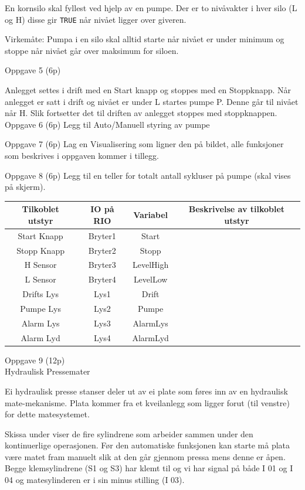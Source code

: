 \vskip 5pt 
En kornsilo skal fyllest ved hjelp av en pumpe. Der er to nivåvakter i hver silo (L og H) disse gir \verb|TRUE| når nivået ligger over giveren.

\vskip 5pt 
Virkemåte: Pumpa i en silo skal alltid starte når nivået er under
minimum og stoppe når nivået går over maksimum for siloen.

\vskip 1cm
Oppgave 5 (6p) %
\vskip 2.5pt 

Anlegget settes i drift med en Start knapp og stoppes med en Stoppknapp.
Når anlegget er satt i drift og nivået er under L startes pumpe P.
Denne går til nivået når H. Slik fortsetter det til driften av anlegget
stoppes med stoppknappen.
\vskip 5pt 
Oppgave 6 (6p) %
\vskip 2.5pt 
Legg til Auto/Manuell styring av pumpe

\vskip 10pt 
Oppgave 7 (6p) %
\vskip 2.5pt 
Lag en Visualisering som ligner den på bildet, alle funksjoner som beskrives i oppgaven kommer i tillegg. 

\vskip 10pt 
Oppgave 8 (6p) %
\vskip 2.5pt 
Legg til en teller for totalt antall sykluser på pumpe (skal vises på skjerm). 
\vskip 1cm

\vskip 5pt 
\vskip 0.5cm
\begin{tabular}{|c|c|c|c|}
\hline 
Tilkoblet utstyr & IO på RIO & Variabel & Beskrivelse av tilkoblet utstyr\tabularnewline
\hline 
\hline 
Start Knapp & Bryter1 & Start & \tabularnewline
\hline 
Stopp Knapp & Bryter2 & Stopp & \tabularnewline
\hline 
H Sensor & Bryter3 & LevelHigh & \tabularnewline
\hline 
L Sensor & Bryter4 & LevelLow & \tabularnewline
\hline 
Drifts Lys & Lys1 & Drift & \tabularnewline
\hline 
Pumpe Lys & Lys2 & Pumpe & \tabularnewline
\hline 
Alarm Lys & Lys3 & AlarmLys & \tabularnewline
\hline 
Alarm Lyd & Lys4 & AlarmLyd & \tabularnewline
\hline 
\end{tabular}

\vfil\eject
Oppgave 9 (12p) \\ %

Hydraulisk Pressemater 

\vskip 5pt 
Ei hydraulisk presse stanser deler ut av ei plate som føres inn av
en hydraulisk mate-mekanisme. Plata kommer fra et kveilanlegg som
ligger forut (til venstre) for dette matesystemet.

\vskip 5pt 
Skissa under viser de fire sylindrene som arbeider sammen under den kontinuerlige operasjonen. Før den automatiske funksjonen kan starte må plata være matet fram manuelt slik at den går gjennom pressa mens denne er åpen. Begge klemsylindrene (S1 og S3) har klemt til og vi har signal på både I 01 og I 04 og matesylinderen er i sin minus stilling (I 03). 
\vskip 5pt 


